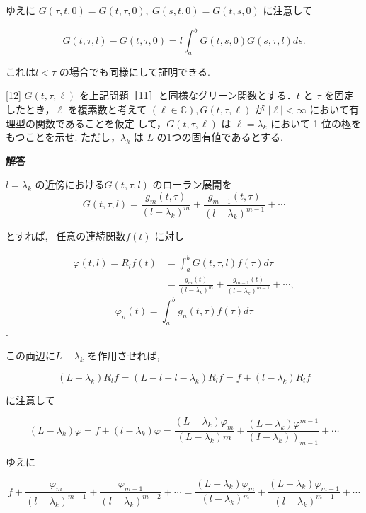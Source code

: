 \documentclass{jsarticle}
\begin{document}
ゆえに $G(\tau,t,0) = G(t, \tau,0), \ G(s,t,0) = G(t,s,0)$ に注意して

$$
G(t, \tau, l)-G(t, \tau, 0)= l \int_{a}^{b} G(t, s, 0) G(s, \tau, l) d s.
$$

これは$l < \tau$ の場合でも同様にして証明できる.



\bigskip
\bigskip

\begin{itembox}[l]{[12]}
$G(t, \tau, \ell)$ を上記問題［11］と同様なグリーン関数とする．$t$ と $\tau$ を固定したとき，$\ell$ を複素数と考えて $(\ell \in \mathbb{C}), G(t, \tau, \ell)$ が $|\ell|<\infty$ において有理型の関数であることを仮定 して，$G(t, \tau, \ell)$ は $\ell=\lambda_{k}$ において 1 位の極をもつことを示せ. ただし，$\lambda_{k}$ は $L$ の$1$つの固有値であるとする.
\end{itembox}

\textbf{解答}

$l = \lambda_k$ の近傍における$G(t,\tau,l)$ のローラン展開を
$$
G(t,\tau,l) = \frac{g_m(t,\tau)}{(l-\lambda_k)^m} + \frac{g_{m-1}(t,\tau)}{(l-\lambda_k)^{m-1}} + \cdots
$$

とすれば, \ 任意の連続関数$f(t)$ に対し

$$
\begin{aligned}
\varphi(t,l) = R_l f(t) &= \int_a^b G(t,\tau,l) f(\tau) d\tau \\
&= \frac{g_m(t)}{(l-\lambda_k)^m} + \frac{g_{m-1}(t)}{(l-\lambda_k)^{m-1}} + \cdots,
\end{aligned}
$$
$$\varphi_n(t) = \displaystyle\int_a^b g_n(t,\tau) f(\tau) d\tau$$.

この両辺に$L-\lambda_k$ を作用させれば, 

$$
(L-\lambda_k)R_l f = (L - l + l - \lambda_k)R_l f = f + (l-\lambda_k)R_l f
$$

に注意して

$$
\left(L-\lambda_{k}\right) \varphi =f+\left(l-\lambda_{k}\right) \varphi
=\frac{\left(L-\lambda_{k}\right) \varphi_{m}}{\left(L-\lambda_{k}\right) m}+\frac{\left(L-\lambda_{k}\right) \varphi^{m-1}}{\left.\left(I-\lambda_{k}\right)\right)_{m-1}}+\cdots
$$

ゆえに

$$
f+\frac{\varphi_{m}}{\left(l-\lambda_{k}\right)^{m-1}}+\frac{\varphi_{m-1}}{\left(l-\lambda_{k}\right)^{m-2}}+\cdots=\frac{\left(L-\lambda_{k}\right) \varphi_{m}}{\left(l-\lambda_{k}\right){ }^{m}}+\frac{\left(L-\lambda_{k}\right) \varphi_{m-1}}{\left(l-\lambda_{k}\right)^{m-1}}+\cdots
$$
\end{document}
